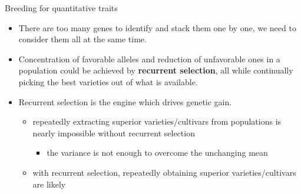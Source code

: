 \documentclass[11pt,ignorenonframetext,aspectratio=169]{beamer}
\providecommand{\tightlist}{%
  \setlength{\itemsep}{0pt}\setlength{\parskip}{0pt}}
\begin{document}
\begin{frame}{Breeding for quantitative traits}
\protect\hypertarget{breeding-for-quantitative-traits}{}
\begin{itemize}
\tightlist
\item
  There are too many genes to identify and stack them one by one, we
  need to consider them all at the same time.
\item
  Concentration of favorable alleles and reduction of unfavorable ones
  in a population could be achieved by \textbf{recurrent selection}, all
  while continually picking the best varieties out of what is available.
\item
  Recurrent selection is the engine which drives genetic gain.

  \begin{itemize}
  \tightlist
  \item
    repeatedly extracting superior varieties/cultivars from populations
    is nearly impossible without recurrent selection

    \begin{itemize}
    \tightlist
    \item
      the variance is not enough to overcome the unchanging mean
    \end{itemize}
  \item
    with recurrent selection, repeatedly obtaining superior
    varieties/cultivars are likely
  \end{itemize}
\end{itemize}
\end{frame}
\end{document}
